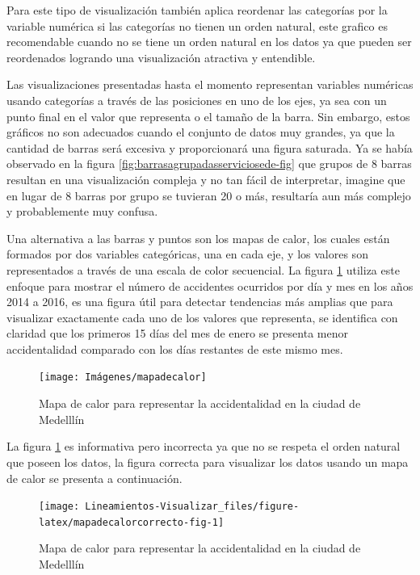 \documentclass[
]{book}
\begin{document}
Para este tipo de visualización también aplica reordenar las categorías por la variable numérica si las categorías no tienen un orden natural, este grafico es recomendable cuando no se tiene un orden natural en los datos ya que pueden ser reordenados logrando una visualización atractiva y entendible.

Las visualizaciones presentadas hasta el momento representan variables numéricas usando categorías a través de las posiciones en uno de los ejes, ya sea con un punto final en el valor que representa o el tamaño de la barra. Sin embargo, estos gráficos no son adecuados cuando el conjunto de datos muy grandes, ya que la cantidad de barras será excesiva y proporcionará una figura saturada. Ya se había observado en la figura \ref{fig:barrasagrupadasserviciosede-fig} que grupos de 8 barras resultan en una visualización compleja y no tan fácil de interpretar, imagine que en lugar de 8 barras por grupo se tuvieran 20 o más, resultaría aun más complejo y probablemente muy confusa.

Una alternativa a las barras y puntos son los mapas de calor, los cuales están formados por dos variables categóricas, una en cada eje, y los valores son representados a través de una escala de color secuencial. La figura \ref{fig:mapadecalor-fig} utiliza este enfoque para mostrar el número de accidentes ocurridos por día y mes en los años 2014 a 2016, es una figura útil para detectar tendencias más amplias que para visualizar exactamente cada uno de los valores que representa, se identifica con claridad que los primeros 15 días del mes de enero se presenta menor accidentalidad comparado con los días restantes de este mismo mes.

\begin{figure}

{\centering \texttt{[image: Imágenes/mapadecalor]} 

}

\caption{Mapa de calor para representar la accidentalidad en la ciudad de Medelllín}\label{fig:mapadecalor-fig}
\end{figure}

La figura \ref{fig:mapadecalor-fig} es informativa pero incorrecta ya que no se respeta el orden natural que poseen los datos, la figura correcta para visualizar los datos usando un mapa de calor se presenta a continuación.

\begin{figure}

{\centering \texttt{[image: Lineamientos-Visualizar\_files/figure-latex/mapadecalorcorrecto-fig-1]} 

}

\caption{Mapa de calor para representar la accidentalidad en la ciudad de Medelllín}\label{fig:mapadecalorcorrecto-fig}
\end{figure}
\end{document}
